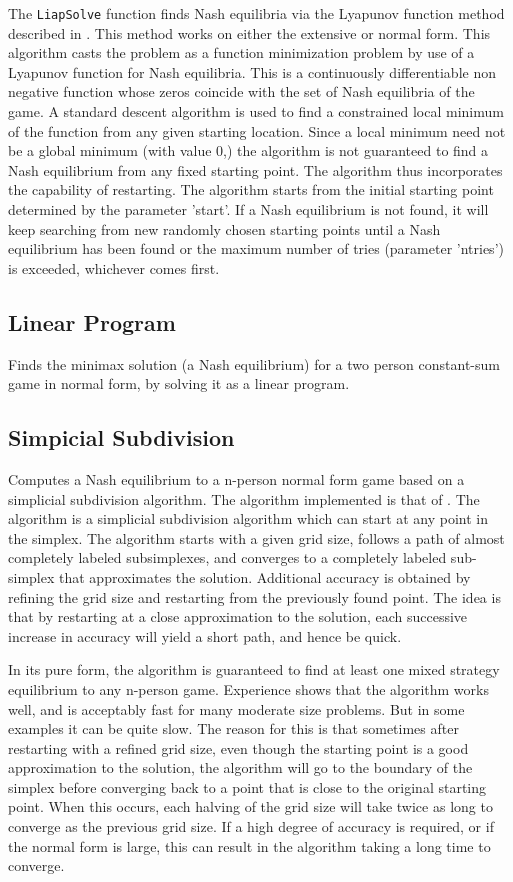 The {\tt LiapSolve} function finds Nash equilibria via the Lyapunov
function method described in \cite{McK:91}.  This method works on
either the extensive or normal form.  This algorithm casts the problem
as a function minimization problem by use of a Lyapunov function for
Nash equilibria.  This is a continuously differentiable non negative
function whose zeros coincide with the set of Nash equilibria of the
game.  A standard descent algorithm is used to find a constrained
local minimum of the function from any given starting location.  Since
a local minimum need not be a global minimum (with value 0,) the
algorithm is not guaranteed to find a Nash equilibrium from any fixed
starting point.  The algorithm thus incorporates the capability of
restarting.  The algorithm starts from the initial starting point
determined by the parameter 'start'.  If a Nash equilibrium is not
found, it will keep searching from new randomly chosen starting points
until a Nash equilibrium has been found or the maximum number of tries
(parameter 'ntries') is exceeded, whichever comes first.

\subsection{Linear Program}

Finds the minimax solution (a Nash equilibrium) for a two person
constant-sum game in normal form, by solving it as a linear program.

\subsection{Simpicial Subdivision}

Computes a Nash equilibrium to a n-person normal form game based on a
simplicial subdivision algorithm.  The algorithm implemented is that
of \cite{VTH:1987}.  The algorithm is a simplicial subdivision
algorithm which can start at any point in the simplex.  The algorithm
starts with a given grid size, follows a path of almost completely
labeled subsimplexes, and converges to a completely labeled
sub-simplex that approximates the solution.  Additional accuracy is
obtained by refining the grid size and restarting from the previously
found point.  The idea is that by restarting at a close approximation
to the solution, each successive increase in accuracy will yield a
short path, and hence be quick.

In its pure form, the algorithm is guaranteed to find at least one
mixed strategy equilibrium to any n-person game.  Experience shows
that the algorithm works well, and is acceptably fast for many
moderate size problems.  But in some examples it can be quite slow.
The reason for this is that sometimes after restarting with a refined
grid size, even though the starting point is a good approximation to
the solution, the algorithm will go to the boundary of the simplex
before converging back to a point that is close to the original
starting point.  When this occurs, each halving of the grid size will
take twice as long to converge as the previous grid size.  If a high
degree of accuracy is required, or if the normal form is large, this
can result in the algorithm taking a long time to converge.

